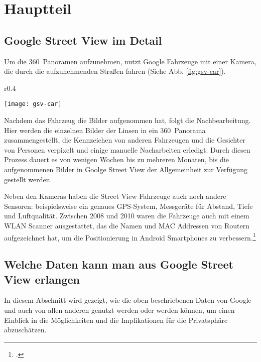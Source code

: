 \newpage

\section{Hauptteil}\label{hauptteil}

\subsection{Google Street View im Detail}\label{street-view-detail}

Um die 360\degree\ Panoramen aufzunehmen, nutzt Google Fahrzeuge mit einer
Kamera, die durch die aufzunehmenden Straßen fahren (Siehe Abb.
\ref{fig:gsv-car}).

\begin{wrapfigure}{r}{0.4\textwidth}
  \caption{Google Street View Fahrzeug}\label{fig:gsv-car}
  \begin{center}
    \texttt{[image: gsv-car]}
    \\
    \cite[Quelle:][]{website:google-street-view:about}
  \end{center}
\end{wrapfigure}

Nachdem das Fahrzeug die Bilder aufgenommen hat, folgt die Nachbearbeitung. Hier
werden die einzelnen Bilder der Linsen in ein 360\degree\ Panorama zusammengestellt,
die Kennzeichen von anderen Fahrzeugen und die Gesichter von Personen verpixelt
und einige manuelle Nacharbeiten erledigt. Durch diesen Prozess dauert es von wenigen
Wochen bis zu mehreren Monaten, bis die aufgenommenen Bilder in Goolge Street
View der Allgemeinheit zur Verfügung gestellt werden.

Neben den Kameras haben die Street View Fahrzeuge auch noch andere Sensoren:
beispielsweise ein genaues \ac{GPS}-System, Messgeräte für Abstand, Tiefe und
Luftqualität. Zwischen 2008 und 2010 waren die Fahrzeuge auch mit einem \ac{WLAN}
Scanner ausgestattet, das die Namen und \ac{MAC} Addressen von Routern aufgezeichnet
hat, um die Positionierung in Android Smartphones zu verbessern.\footcite{website:trekview:gsv-sensors}

\subsection{Welche Daten kann man aus Google Street View erlangen}

In diesem Abschnitt wird gezeigt, wie die oben beschriebenen Daten von Google
und auch von allen anderen genutzt werden oder werden können, um einen Einblick
in die Möglichkeiten und die Implikationen für die Privatsphäre abzuschätzen.


